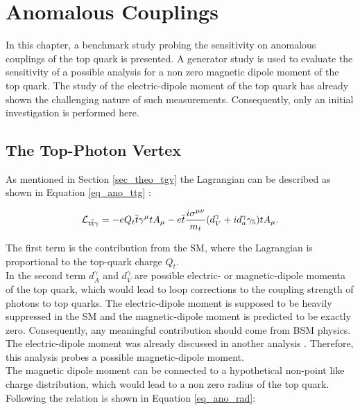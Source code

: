 \chapter{Anomalous Couplings}
\label{sec_ano}

In this chapter, a benchmark study probing the sensitivity on anomalous couplings of the top quark is presented. A generator study is used to evaluate the sensitivity of a possible \ttgamma analysis for a non zero magnetic dipole moment of the top quark. The study of the electric-dipole moment of the top quark \cite{Backes} has already shown the challenging nature of such measurements. Consequently, only an initial investigation is performed here.

\section{The Top-Photon Vertex}
\label{sec_ano_theo}

As mentioned in Section \ref{sec_theo_tgv} the \ttgamma Lagrangian can be described as shown in  Equation \ref{eq_ano_ttg} \cite{AguilarSaavedra:2008zc}:

\begin{equation}
  \mathcal{L}_{\mathrm{t}\overline{\mathrm{t}} \gamma} = -e Q_t \overline{t} \gamma^{\mu} t A_{\mu} - e \overline{t} \frac{i \sigma^{\mu \nu}}{m_t} (d_V^{\gamma} + i d_a^{\gamma} \gamma_5) t A_{\mu}.
  \label{eq_ano_ttg}
  \end{equation}

The first term is the contribution from the SM, where the Lagrangian is proportional to the top-quark charge $Q_t$.\\
In the second term $d_A^{\gamma}$ and $d_V^{\gamma}$ are possible electric- or  magnetic-dipole momenta of the top quark, which would lead to loop corrections to the coupling strength of photons to top quarks. The electric-dipole moment is supposed to be heavily suppressed in the SM \cite{Jersak:1981sp} and the magnetic-dipole moment is predicted to be exactly zero. Consequently, any meaningful contribution should come from BSM physics. The electric-dipole moment was already discussed in another analysis \cite{Backes}. Therefore, this analysis probes a possible magnetic-dipole moment.\\
The  magnetic dipole moment can be connected to a hypothetical non-point like charge distribution, which would lead to a non zero radius of the top quark. Following \cite{Englert:2012by,Kopp:1994qv} the relation is shown in Equation \ref{eq_ano_rad}:

